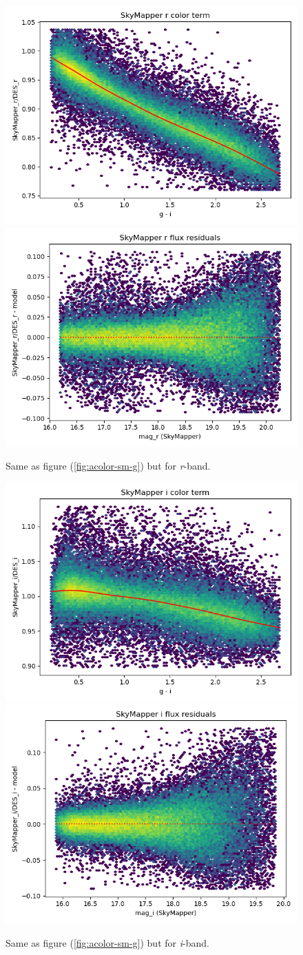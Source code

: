 \begin{figure}
    \includegraphics[width=0.49\linewidth]{./figures/color_terms/SkyMapper_to_DES_band_r_color_term.png}
    \includegraphics[width=0.49\linewidth]{./figures/color_terms/SkyMapper_to_DES_band_r_flux_residuals.png}
    \caption{Same as figure (\ref{fig:acolor-sm-g}) but for \textit{r}-band.}
\end{figure}
\begin{figure}
    \includegraphics[width=0.49\linewidth]{./figures/color_terms/SkyMapper_to_DES_band_i_color_term.png}
    \includegraphics[width=0.49\linewidth]{./figures/color_terms/SkyMapper_to_DES_band_i_flux_residuals.png}
    \caption{Same as figure (\ref{fig:acolor-sm-g}) but for \textit{i}-band.}
\end{figure}
